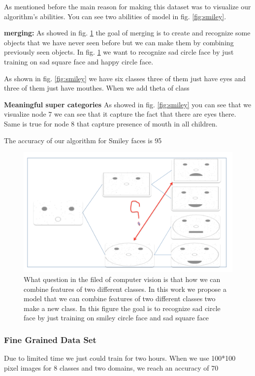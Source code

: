 \documentclass[10pt,twocolumn,letterpaper]{article}
\begin{document}
 As mentioned before the main reason for making this dataset was to visualize our algorithm's abilities. You can see two abilities of model in fig. \ref{fig:smiley}.
 
\textbf{merging:} As showed in fig. \ref{merge} the goal of merging is to create and recognize some objects that we have never seen before but we can make them by combining previously seen objects. In fig. \ref{merge} we want to recognize sad circle face by just training on sad square face and happy circle face.

As shown in fig. \ref{fig:smiley} we have six classes three of them just have eyes and three of them just have mouthes. When we add theta of class 
 
\textbf{Meaningful super categories} As showed in fig. \ref{fig:smiley} you can see that we visualize node 7 we can see that it capture the fact that there are eyes there. Same is true for node 8 that capture presence of mouth in all children.

The accuracy of our algorithm for Smiley faces is 95%
   
 \begin{figure}[t]
 	\begin{center}
 		\includegraphics[width=0.8\linewidth]{merge}
 	\end{center}
 	\caption{What question in the filed of computer vision is that how we can combine features of two different classes. In this work we propose a model that we can combine features of two different classes two make a new class. In this figure the goal is to recognize sad circle face by just training on smiley circle face and sad square face}
 	\label{merge}
 \end{figure}
 
 


 \subsubsection{Fine Grained Data Set}
Due to limited time we just could train for two hours. When we use 100*100 pixel images for 8 classes and two domains, we reach an accuracy of 70%
\end{document}
